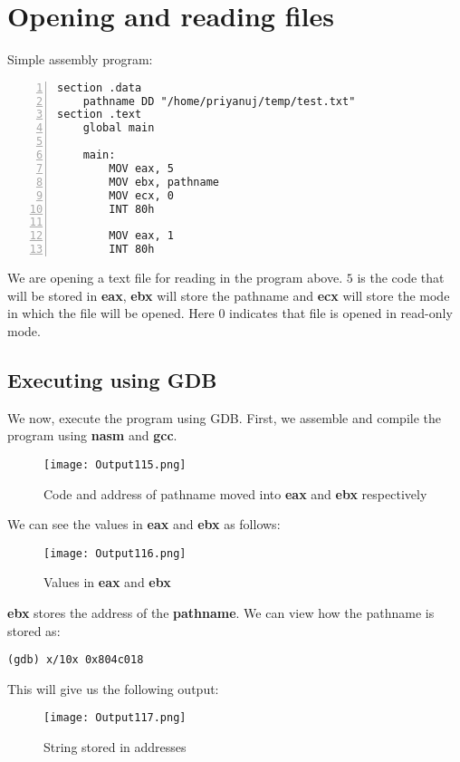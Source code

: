 \documentclass{article}
\makeatletter
\renewcommand\paragraph{\@startsection{paragraph}{4}{\z@}{-3.25ex \@plus -1ex \@minus -.2ex}{1.5ex \@plus .2ex}{\normalfont\normalsize\bfseries}}
\makeatother
\begin{document}
	\section{Opening and reading files}\label{sec:sec1}
	\paragraph{}
	Simple assembly program:
	\begin{lstlisting}[numbers=left, frame=single, breaklines=true]
section .data
	pathname DD "/home/priyanuj/temp/test.txt"
section .text
	global main
	
	main:
		MOV eax, 5
		MOV ebx, pathname
		MOV ecx, 0
		INT 80h
		
		MOV eax, 1
		INT 80h
	\end{lstlisting}
We are opening a text file for reading in the program above. $5$ is the code that will be stored in \textbf{eax}, \textbf{ebx} will store the pathname and \textbf{ecx} will store the mode in which the file will be opened. Here $0$ indicates that file is opened in read-only mode.

\subsection{Executing using GDB}\label{sec:ssec1}
\paragraph{}
We now, execute the program using GDB. First, we assemble and compile the program using \textbf{nasm} and \textbf{gcc}.
\begin{figure}[h]
	\centering
	\texttt{[image: Output115.png]}
	\caption{Code and address of pathname moved into \textbf{eax} and \textbf{ebx} respectively}
	\label{fig:fig1}
\end{figure}
\newpage
We can see the values in \textbf{eax} and \textbf{ebx} as follows:
\begin{figure}[h]
	\centering
	\texttt{[image: Output116.png]}
	\caption{Values in \textbf{eax} and \textbf{ebx}}
	\label{fig:fig2}
\end{figure}

\textbf{ebx} stores the address of the \textbf{pathname}. We can view how the pathname is stored as:
\begin{Verbatim}[frame=single]
(gdb) x/10x 0x804c018
\end{Verbatim}

This will give us the following output:
\begin{figure}[h]
	\centering
	\texttt{[image: Output117.png]}
	\caption{String stored in addresses}
	\label{fig:fig3}
\end{figure}
\end{document}
